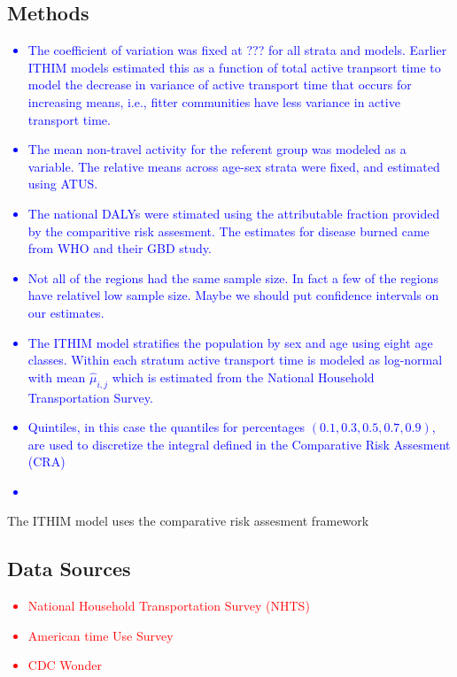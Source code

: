 \documentclass{bioinfo}
\newcommand{\col}[2][red]{\textcolor{#1}{#2}}
\begin{document}
\begin{methods}

\section{Methods}

\col[blue]{\begin{itemize}
  \item The coefficient of variation was fixed at ??? for all strata
    and models.  Earlier ITHIM models estimated this as a function of
    total active tranpsort time to model the decrease in variance of
    active transport time that occurs for increasing means, i.e.,
    fitter communities have less variance in active transport time.
  \item The mean non-travel activity for the referent group was
    modeled as a variable.  The relative means across age-sex strata
    were fixed, and estimated using ATUS.
  \item The national DALYs were stimated using the attributable
    fraction provided by the comparitive risk assesment.  The
    estimates for disease burned came from WHO and their GBD study.
  \item Not all of the regions had the same sample size.  In fact a
    few of the regions have relativel low sample size.  Maybe we
    should put confidence intervals on our estimates.
  \item The ITHIM model stratifies the population by sex and age using
    eight age classes.  Within each stratum active transport time is
    modeled as log-normal with mean $\hat{\mu}_{i,j}$ which is
    estimated from the National Household Transportation Survey.
  \item Quintiles, in this case the quantiles for percentages
    $(0.1,0.3,0.5,0.7,0.9)$, are used to discretize the integral
    defined in the Comparative Risk Assesment (CRA)
  \item 
\end{itemize}}

The ITHIM model uses the comparative risk assesment framework 

\subsection{Data Sources}

\col[red]{\begin{itemize}
\item National Household Transportation Survey (NHTS)
\item American time Use Survey
\item CDC Wonder
\end{itemize}}


\end{methods}
\end{document}

